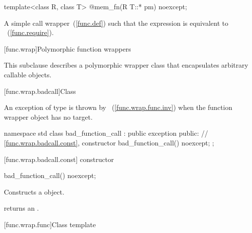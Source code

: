 %
\begin{itemdecl}
template<class R, class T> @\unspec@ mem_fn(R T::* pm) noexcept;
\end{itemdecl}

\begin{itemdescr}
\pnum
\returns A simple call wrapper~(\ref{func.def}) 
such that the expression  is equivalent
to ~(\ref{func.require}).
\end{itemdescr}

[func.wrap]{Polymorphic function wrappers}%

\pnum
This subclause describes a polymorphic wrapper class that
encapsulates arbitrary callable objects.

[func.wrap.badcall]{Class }%
%

\pnum
An exception of type  is thrown by
~(\ref{func.wrap.func.inv})
when the function wrapper object has no target.

\begin{codeblock}
namespace std {
  class bad_function_call : public exception {
  public:
    // \ref{func.wrap.badcall.const}, constructor
    bad_function_call() noexcept;
  };
}
\end{codeblock}

[func.wrap.badcall.const]{ constructor}

%
%
\begin{itemdecl}
bad_function_call() noexcept;
\end{itemdecl}

\begin{itemdescr}
\pnum\effects Constructs a  object.
\end{itemdescr}

\begin{itemdescr}
\pnum\postconditions  {} returns an
 \ntbs.
\end{itemdescr}

[func.wrap.func]{Class template }
%


